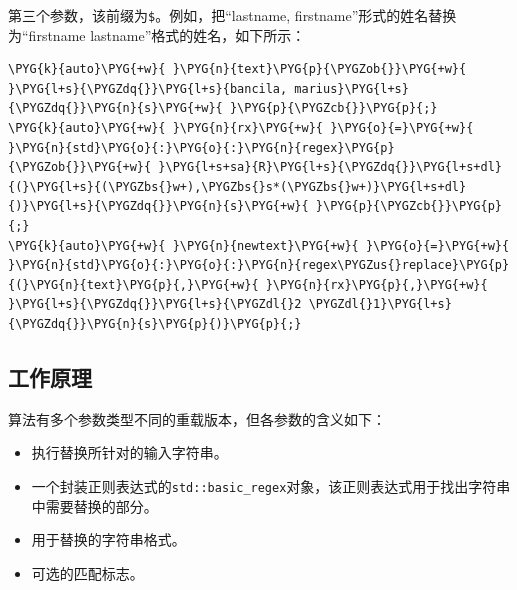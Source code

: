 
第三个参数，该前缀为\texttt{\$}。例如，把“lastname, firstname”形式的姓名替换为“firstname lastname”格式的姓名，如下所示：



\begin{codeblockbg}
\begin{Verbatim}[commandchars=\\\{\},breaklines=true,breakanywhere=true,fontsize=\codefont,xleftmargin=17bp]
\PYG{k}{auto}\PYG{+w}{ }\PYG{n}{text}\PYG{p}{\PYGZob{}}\PYG{+w}{ }\PYG{l+s}{\PYGZdq{}}\PYG{l+s}{bancila, marius}\PYG{l+s}{\PYGZdq{}}\PYG{n}{s}\PYG{+w}{ }\PYG{p}{\PYGZcb{}}\PYG{p}{;}
\PYG{k}{auto}\PYG{+w}{ }\PYG{n}{rx}\PYG{+w}{ }\PYG{o}{=}\PYG{+w}{ }\PYG{n}{std}\PYG{o}{:}\PYG{o}{:}\PYG{n}{regex}\PYG{p}{\PYGZob{}}\PYG{+w}{ }\PYG{l+s+sa}{R}\PYG{l+s}{\PYGZdq{}}\PYG{l+s+dl}{(}\PYG{l+s}{(\PYGZbs{}w+),\PYGZbs{}s*(\PYGZbs{}w+)}\PYG{l+s+dl}{)}\PYG{l+s}{\PYGZdq{}}\PYG{n}{s}\PYG{+w}{ }\PYG{p}{\PYGZcb{}}\PYG{p}{;}
\PYG{k}{auto}\PYG{+w}{ }\PYG{n}{newtext}\PYG{+w}{ }\PYG{o}{=}\PYG{+w}{ }\PYG{n}{std}\PYG{o}{:}\PYG{o}{:}\PYG{n}{regex\PYGZus{}replace}\PYG{p}{(}\PYG{n}{text}\PYG{p}{,}\PYG{+w}{ }\PYG{n}{rx}\PYG{p}{,}\PYG{+w}{ }\PYG{l+s}{\PYGZdq{}}\PYG{l+s}{\PYGZdl{}2 \PYGZdl{}1}\PYG{l+s}{\PYGZdq{}}\PYG{n}{s}\PYG{p}{)}\PYG{p}{;}
\end{Verbatim}
\end{codeblockbg}



\subsection{工作原理}



算法有多个参数类型不同的重载版本，但各参数的含义如下：



\begin{itemize}
\item 执行替换所针对的输入字符串。



\item 一个封装正则表达式的\texttt{std::\allowbreak{}basic\_\allowbreak{}regex}对象，该正则表达式用于找出字符串中需要替换的部分。



\item 用于替换的字符串格式。



\item 可选的匹配标志。

\end{itemize}


